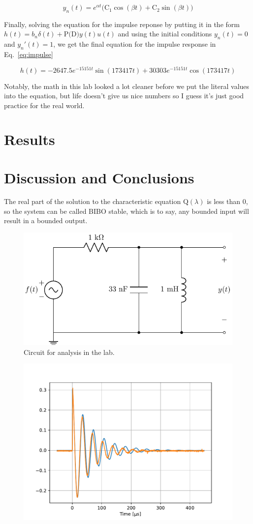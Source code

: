 \documentclass[11pt]{texMemo-gibbons}
\begin{document}
\[
y_n(t)=e^{\alpha t} \big(\text{C}_1  \cos (\beta t) + \text{C}_2 \sin (\beta t) \big) 
\]

Finally, solving the equation for the impulse reponse
by putting it in the form $h(t)=b_n \delta(t) + \text{P(D)}y(t)u(t)$
and using the initial conditions $y_n(t)=0$ and $y_n'(t)=1$,
we get the final equation for the impulse response in
Eq.~\ref{eq:impulse}

\begin{equation}
  \label{eq:impulse}
  h(t)= -2647.5 e^{-15151t} \sin(173417 t) + 30303 e^{-15151t} \cos(173417t)
\end{equation}

Notably, the math in this lab looked a lot cleaner before
we put the literal values into the equation, but life
doesn't give us nice numbers so I guess it's just good
practice for the real world.

\section{Results}
\label{sec:results}

\section{Discussion and Conclusions}
\label{sec:conclusions}

The real part of the solution to the characteristic
equation $\text{Q}(\lambda)$ is less than 0, so the system
can be called BIBO stable, which is to say, any
bounded input will result in a bounded output.



\clearpage

\begin{figure}[h!]
  \centering
  \includegraphics[width=0.7\linewidth]{circuits/circuit_01.pdf}
  \caption{Circuit for analysis in the lab.}
  \label{fig:circuit}
\end{figure}

\begin{figure}[h!]
  \centering
  \includegraphics[width=0.7\linewidth]{plots/plot.pdf}
  \caption{}
  \label{fig:plot}
\end{figure}
\end{document}
